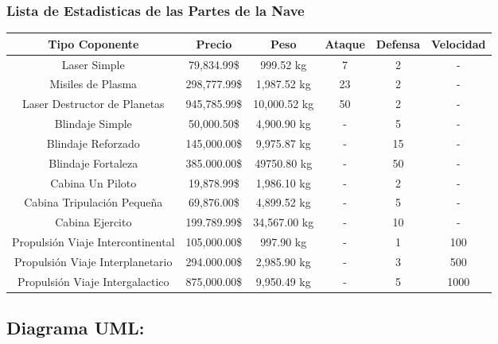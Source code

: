 \documentclass{article}
\begin{document}
\begin{itemize}
\subsubsection{Lista de Estadisticas de las Partes de la Nave}
\begin{table}[]
	\centering
	\begin{tabular}{|c|c|c|c|c|c|}
		\hline
		Tipo Coponente & Precio & Peso & Ataque & Defensa & Velocidad \\ \hline
		Laser Simple & 79,834.99\$ & 999.52 kg & 7 & 2 & - \\
		Misiles de Plasma & 298,777.99\$ & 1,987.52 kg & 23 & 2 & - \\
		Laser Destructor de Planetas & 945,785.99\$ & 10,000.52 kg & 50 & 2 & - \\
		Blindaje Simple & 50,000.50\$ & 4,900.90 kg & - & 5 & - \\
		Blindaje Reforzado & 145,000.00\$ & 9,975.87 kg & - & 15 & - \\
		Blindaje Fortaleza & 385.000.00\$ & 49750.80 kg & - & 50 & - \\
		Cabina Un Piloto & 19,878.99\$ & 1,986.10 kg & - & 2 & - \\
		Cabina Tripulación Pequeña & 69,876.00\$ & 4,899.52 kg & - & 5 & - \\
		Cabina Ejercito & 199.789.99\$ & 34,567.00 kg & - & 10 & - \\
		Propulsión Viaje Intercontinental & 105,000.00\$ & 997.90 kg & - & 1 & 100 \\
		Propulsión Viaje Interplanetario & 294.000.00\$ & 2,985.90 kg & - & 3 & 500 \\
		Propulsión Viaje Intergalactico & 875,000.00\$ & 9,950.49 kg & - & 5 & 1000 \\ \hline
	\end{tabular}
\end{table}
\end{itemize}

\newpage
\subsection*{Diagrama UML:}
\end{document}
